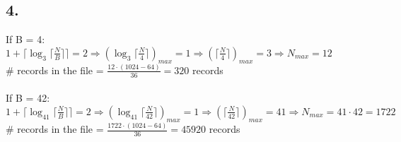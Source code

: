 \documentclass[12pt]{article}
\begin{document}
	\subsection*{4.}
	If B = 4:\\
	$1+ \lceil \log_{3}{ \lceil\frac{N}{B}\rceil }\rceil=2\Rightarrow (\log_3{\lceil\frac{N}{4}\rceil})_{max}=1\Rightarrow (\lceil\frac{N}{4}\rceil)_{max}=3 \Rightarrow N_{max}=12$\\
	\# records in the file = $\frac{12\cdot (1024-64)}{36}= 320$ records \\
	\\
	If B = 42:\\
	$1+ \lceil \log_{41}{ \lceil\frac{N}{B}\rceil }\rceil=2\Rightarrow (\log_41{\lceil\frac{N}{42}\rceil})_{max}=1\Rightarrow (\lceil\frac{N}{42}\rceil)_{max}=41 \Rightarrow N_{max}=41\cdot 42 = 1722$\\
	\# records in the file = $\frac{1722\cdot (1024-64)}{36}= 45920$ records \\
\end{document}
